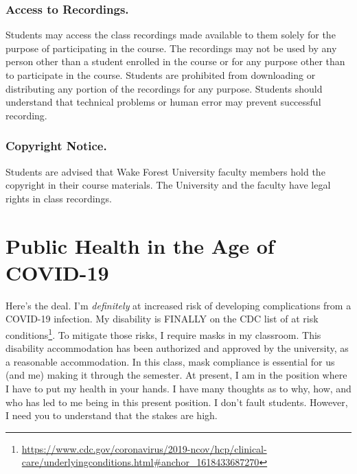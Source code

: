 \hypertarget{access-to-recordings.}{%
\subsection{Access to Recordings.}\label{access-to-recordings.}}

Students may access the class recordings made available to them solely for the purpose of participating in the course. The recordings may not be used by any person other than a student enrolled in the course or for any purpose other than to participate in the course. Students are prohibited from downloading or distributing any portion of the recordings for any purpose. Students should understand that technical problems or human error may prevent successful recording.

\hypertarget{copyright-notice.}{%
\subsection{Copyright Notice.}\label{copyright-notice.}}

Students are advised that Wake Forest University faculty members hold the copyright in their course materials. The University and the faculty have legal rights in class recordings.

\hypertarget{public-health-in-the-age-of-covid-19}{%
\chapter{Public Health in the Age of COVID-19}\label{public-health-in-the-age-of-covid-19}}

Here's the deal. I'm \emph{definitely} at increased risk of developing complications from a COVID-19 infection. My disability is FINALLY on the CDC list of at risk conditions\footnote{\url{https://www.cdc.gov/coronavirus/2019-ncov/hcp/clinical-care/underlyingconditions.html\#anchor_1618433687270}}. To mitigate those risks, I require masks in my classroom. This disability accommodation has been authorized and approved by the university, as a reasonable accommodation. In this class, mask compliance is essential for us (and me) making it through the semester. At present, I am in the position where I have to put my health in your hands. I have many thoughts as to why, how, and who has led to me being in this present position. I don't fault students. However, I need you to understand that the stakes are high.


